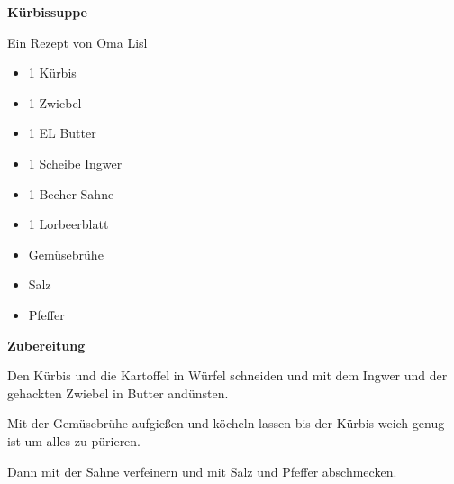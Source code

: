 
\parindent0pt	

\pagestyle{empty}


\textbf{{\LARGE Kürbissuppe}}%

\hrulefill

Ein Rezept von Oma Lisl
\vspace*{\fill}
\begin{multicols}{2}	


\begin{itemize}
\item 1 Kürbis
\item 1 Zwiebel
\item 1 EL Butter
\item 1 Scheibe Ingwer
\item 1 Becher Sahne
\end{itemize}
\vfill									%
\columnbreak								%

\begin{itemize}
\item 1 Lorbeerblatt
\item Gemüsebrühe
\item Salz
\item Pfeffer 
\end{itemize}
\end{multicols}

\vspace{2cm}			%


\vfill
\newpage
\textbf{{\LARGE Zubereitung}}%

\hrulefill

\vspace*{\fill}
\begin{multicols}{2}

Den Kürbis und die Kartoffel in Würfel schneiden und mit dem Ingwer und der gehackten Zwiebel in
Butter andünsten.

Mit der Gemüsebrühe aufgießen und köcheln lassen bis der Kürbis weich genug ist um
 alles zu pürieren.

Dann mit der Sahne verfeinern und mit Salz und Pfeffer abschmecken.


\end{multicols}
\vfill
